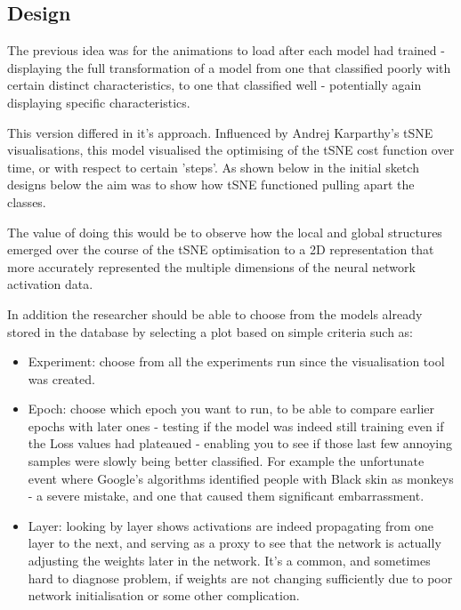 \documentclass[a4paper,11pt,titlepage]{article}
\begin{document}
	\subsection{Design}
	The previous idea was for the animations to load after each model had trained - displaying the full transformation of a model from one that classified poorly with certain distinct characteristics, to one that classified well - potentially again displaying specific characteristics. 
	\par 
	This version differed in it's approach. Influenced by Andrej Karparthy's tSNE visualisations, this model visualised the optimising of the tSNE cost function over time, or with respect to certain 'steps'. As shown below in the initial sketch designs below the aim was to show how tSNE functioned pulling apart the classes. 
	\par 
	The value of doing this would be to observe how the local and global structures emerged over the course of the tSNE optimisation to a 2D representation that more accurately represented the multiple dimensions of the neural network activation data. 
	\par 
	In addition the researcher should be able to choose from the models already stored in the database by selecting a plot based on simple criteria such as: 
	\begin{itemize}
		\item Experiment: choose from all the experiments run since the visualisation tool was created.
		\item Epoch: choose which epoch you want to run, to be able to compare earlier epochs with later ones - testing if the model was indeed still training even if the Loss values had plateaued - enabling you to see if those last few annoying samples were slowly being better classified. For example the unfortunate event where Google's algorithms identified people with Black skin as monkeys - a severe mistake, and one that caused them significant embarrassment. 
		\item Layer: looking by layer shows activations are indeed propagating from one layer to the next, and serving as a proxy to see that the network is actually adjusting the weights later in the network. It's a common, and sometimes hard to diagnose problem, if weights are not changing sufficiently due to poor network initialisation or some other complication.
	\end{itemize}	 
	
\end{document}
